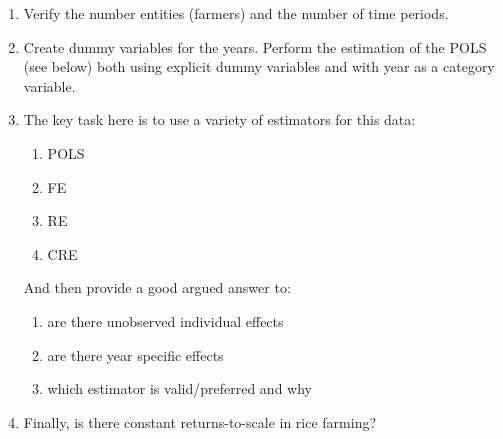 \documentclass[a4paper,10pt]{lec_nmbu}
\begin{document}
\begin{enumerate}
   \item Verify the number entities (farmers) and the number of time periods.

   \item Create dummy variables for the years. Perform the estimation of the POLS (see below) both
         using explicit dummy variables and with year as a category variable.

   \item The key task here is to use a variety of estimators for this data:
         \begin{enumerate}
          \item POLS
          \item FE
          \item RE
          \item CRE
         \end{enumerate}

         And then provide a good argued answer to:
         \begin{enumerate}
          \item are there unobserved individual effects
          \item are there year specific effects
          \item which estimator is valid/preferred and why
         \end{enumerate}

   \item Finally, is there constant returns-to-scale in rice farming?

\end{enumerate}



\end{document}
